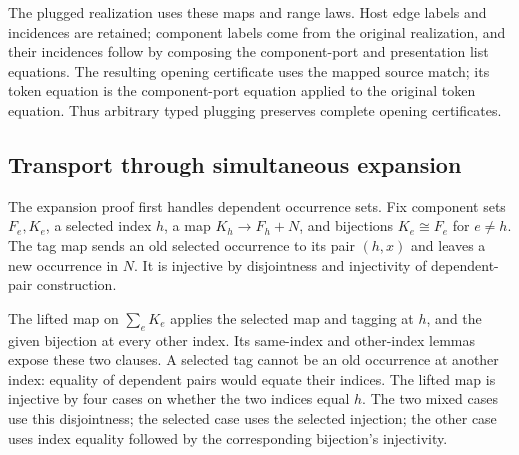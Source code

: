 
The plugged realization uses these maps and range laws. Host edge labels and
incidences are retained; component labels come from the original realization,
and their incidences follow by composing the component-port and presentation
list equations. The resulting opening certificate uses the mapped source
match; its token equation is the component-port equation applied to the
original token equation. Thus arbitrary typed plugging preserves complete
opening certificates.



\subsection{Transport through simultaneous expansion}

The expansion proof first handles dependent occurrence sets. Fix component
sets $F_e,K_e$, a selected index $h$, a map $K_h\to F_h+N$, and bijections
$K_e\cong F_e$ for $e\ne h$. The tag map sends an old selected occurrence to
its pair $(h,x)$ and leaves a new occurrence in $N$. It is injective by
disjointness and injectivity of dependent-pair construction.



The lifted map on $\sum_e K_e$ applies the selected map and tagging at $h$,
and the given bijection at every other index. Its same-index and other-index
lemmas expose these two clauses. A selected tag cannot be an old occurrence
at another index: equality of dependent pairs would equate their indices.
The lifted map is injective by four cases on whether the two indices equal
$h$. The two mixed cases use this disjointness; the selected case uses the
selected injection; the other case uses index equality followed by the
corresponding bijection's injectivity.




